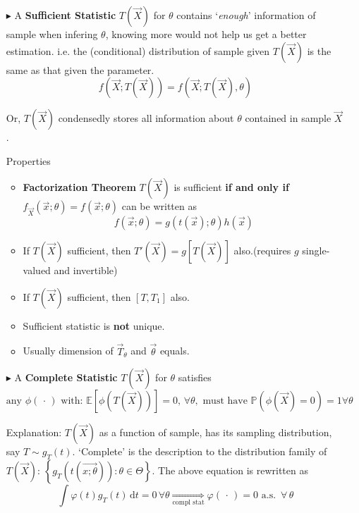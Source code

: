     \begin{itemize}
        \item[$\blacktriangleright$] A \textbf{Sufficient Statistic} $T(\vec{X})$ for $\theta$ contains `\textit{enough}' information of sample when infering $\theta$, knowing more would not help us get a better estimation. i.e. the (conditional) distribution of sample given $ T(\vec{X}) $ is the same as that given the parameter. 
        \begin{equation}
            f(\vec{X};T(\vec{X}))=f(\vec{X};T(\vec{X}),\theta)
        \end{equation}

        Or, $ T(\vec{X}) $ condensedly stores all information about $ \theta  $ contained in sample $ \vec{X} $.

        Properties
        \begin{itemize}
            \item \textbf{Factorization Theorem} $T(\vec{X})$ is sufficient \textbf{if and only if} $f_{\vec{X}}(\vec{x};\theta)=f(\vec{x};\theta)$ can be written as 
            \begin{equation}
                f(\vec{x};\theta)=g\left(t(\vec{x});\theta\right)h(\vec{x})
            \end{equation}            
            \item If $T(\vec{X})$ sufficient, then $T'(\vec{X})=g[T(\vec{X})]$ also.(requires $g$ single-valued and invertible)
            \item If $T(\vec{X})$ sufficient, then $[T,T_1]$ also.
            \item Sufficient statistic is \textbf{not} unique.
            \item Usually dimension of $\vec{T}_\theta$ and $\vec{\theta }$ equals.
        \end{itemize}
        
        
        \item[$\blacktriangleright$] A \textbf{Complete Statistic} $T(\vec{X})$ for $\theta$ satisfies
        \begin{equation}
            \text{any }\phi (\, \cdot \, )\text{ with: }\mathbb{E}\left[ \phi (T(\vec{X})) \right] =0,\,\forall \theta ,\text{ must have } \mathbb{P}\left( \phi (\vec{X}) =0\right) =1\forall \theta  
        \end{equation}

        Explanation: $ T(\vec{X}) $ as a function of sample, has its sampling distribution, say $T\sim g_T(t)$. `Complete' is the description to the distribution family of $ T(\vec{X}) $: $ \left\{g_T\left(t(\vec{x;\theta })\right): \theta \in\Theta \right\} $. The above equation is rewritten as
        \begin{equation}
            \int\varphi (t) g_T(t)\,\mathrm{d} t=0  \,\forall \theta  \mathop{\Rightarrow }\limits_{\text{compl stat}} \varphi(\, \cdot \, )=0 \text{  a.s. }\,\forall\,\theta
        \end{equation}


\end{itemize}
